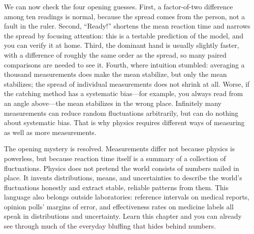 We can now check the four opening guesses. First, a factor-of-two difference among ten readings is normal, because the spread comes from the person, not a fault in the ruler. Second, ``Ready!'' shortens the mean reaction time and narrows the spread by focusing attention: this is a testable prediction of the model, and you can verify it at home. Third, the dominant hand is usually slightly faster, with a difference of roughly the same order as the spread, so many paired comparisons are needed to see it. Fourth, where intuition stumbled: averaging a thousand measurements does make the mean stabilize, but only the mean stabilizes; the spread of individual measurements does not shrink at all. Worse, if the catching method has a systematic bias---for example, you always read from an angle above---the mean stabilizes in the wrong place. Infinitely many measurements can reduce random fluctuations arbitrarily, but can do nothing about systematic bias. That is why physics requires different ways of measuring as well as more measurements.

The opening mystery is resolved. Measurements differ not because physics is powerless, but because reaction time itself is a summary of a collection of fluctuations. Physics does not pretend the world consists of numbers nailed in place. It invents distributions, means, and uncertainties to describe the world's fluctuations honestly and extract stable, reliable patterns from them. This language also belongs outside laboratories: reference intervals on medical reports, opinion polls' margins of error, and effectiveness rates on medicine labels all speak in distributions and uncertainty. Learn this chapter and you can already see through much of the everyday bluffing that hides behind numbers.


